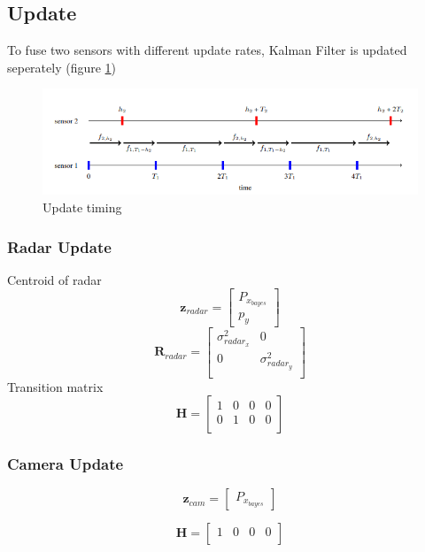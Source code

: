 \subsection{Update}\label{equ:2_update}
To fuse two sensors with different update rates, Kalman Filter is updated seperately (figure \ref{fig:sync_fig})
\begin{figure}[hpbt]
    \centering
    \includegraphics[width=\textwidth]{Figures/sync.png}%
    \caption{Update timing \cite{7472511}}
    \label{fig:sync_fig}
\end{figure}

\subsubsection{Radar Update}\label{sec:2-radar_update}  
Centroid of radar
\begin{equation}
    \mathbf{z}_{radar}=
    \begin{bmatrix}
        P_{x_{bayes}} \\ 
        p_y
    \end{bmatrix}
\end{equation}
\begin{equation}\label{equ:2_radar_R_kf}
    \mathbf{R}_{radar} = 
    \begin{bmatrix}
        \sigma_{radar_x}^2 & 0 \\
        0 & \sigma_{radar_y}^2 \\
      \end{bmatrix}
\end{equation}
Transition matrix
\begin{equation}\label{equ:2_radar_transition_matrix}
    \mathbf{H} = 
    \begin{bmatrix}
        1 & 0 & 0 & 0 \\
        0 & 1 & 0 & 0 \\
      \end{bmatrix}
\end{equation}



\subsubsection{Camera Update}\label{sec:2-camera_update}
\begin{equation}\label{equ:2_z_cam}
    \mathbf{z}_{cam}=
    \begin{bmatrix}P_{x_{bayes}}\end{bmatrix}
\end{equation}

\begin{equation}\label{equ:2_cam_transition_matrix}
    \mathbf{H} = 
    \begin{bmatrix}
        1 & 0 & 0 & 0 \\
      \end{bmatrix}
\end{equation}

